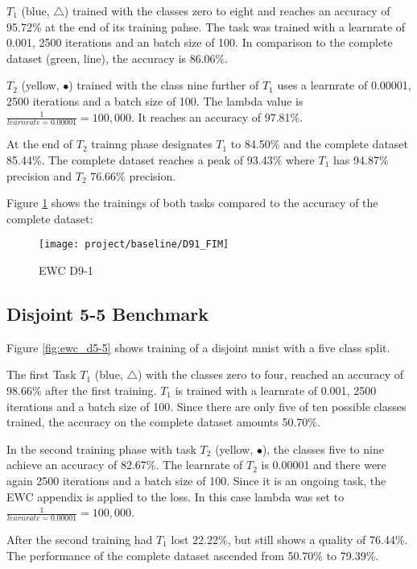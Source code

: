 $T_1$ (blue, $\bigtriangleup$) trained with the classes zero to eight and reaches an accuracy of 95.72\% at the end of its training pahse.
The task was trained with a learnrate of 0.001, 2500 iterations and an batch size of 100.
In comparison to the complete dataset (green, line), the accuracy is 86.06\%.

$T_2$ (yellow, $\bullet$) trained with the class nine further of $T_1$ uses a learnrate of 0.00001, 2500 iterations and a batch size of 100.
The lambda value is $\frac{1}{learnrate = 0.00001} = 100,000$.
It reaches an accuracy of 97.81\%.

At the end of $T_2$ trainng phase designates $T_1$ to 84.50\% and the complete dataset 85.44\%.
The complete dataset reaches a peak of 93.43\% where $T_1$ has 94.87\% precision and $T_2$ 76.66\% precision.

Figure \ref{fig:ewc_d9-1} shows the trainings of both tasks compared to the accuracy of the complete dataset:

\begin{figure}[H]
    \centering
    \texttt{[image: project/baseline/D91\_FIM]}
    \caption{EWC D9-1}
    \label{fig:ewc_d9-1}
\end{figure}

\subsection{Disjoint 5-5 Benchmark}

Figure \ref{fig:ewc_d5-5} shows training of a disjoint mnist with a five class split.

The first Task $T_1$ (blue, $\bigtriangleup$) with the classes zero to four, reached an accuracy of 98.66\% after the first training.
$T_1$ is trained with a learnrate of 0.001, 2500 iterations and a batch size of 100.
Since there are only five of ten possible classes trained, the accuracy on the complete dataset amounts 50.70\%.

In the second training phase with task $T_2$ (yellow, $\bullet$), the classes five to nine achieve an accuracy of 82.67\%.
The learnrate of $T_2$ is 0.00001 and there were again 2500 iterations and a batch size of 100.
Since it is an ongoing task, the EWC appendix is applied to the loss.
In this case lambda was set to $\frac{1}{learnrate = 0.00001} = 100,000$.

After the second training had $T_1$ lost 22.22\%, but still shows a quality of 76.44\%.
The performance of the complete dataset ascended from 50.70\% to 79.39\%.

